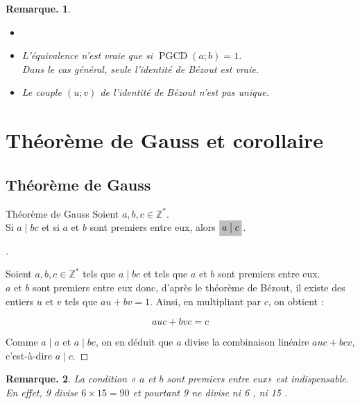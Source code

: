 \documentclass[12pt]{article}
\newcommand{\hideM}[1]{\mbox{\vphantom{$#1$}\smash{\colorbox{gray!50}{$\displaystyle #1$}}} }
\theoremstyle{break}
\newtheorem*{remark}{Remarque.}
\newenvironment{demo}[1][\proofname]{%
  \begin{proof}[#1]$ $\newline
}{%
  \end{proof}
}
\begin{document}
\begin{remark}
\begin{itemize}[noitemsep,topsep=0pt]
  \item[]
  \item L'équivalence n'est vraie que si $\operatorname{PGCD}(a ; b)=1$.
  \\Dans le cas général, seule l'identité de Bézout est vraie.
  \item Le couple $(u ; v)$ de l'identité de Bézout n'est pas unique.
\end{itemize}
\end{remark}

\section{Théorème de Gauss et corollaire}
\subsection{Théorème de Gauss}
\begin{proposition}{Théorème de Gauss}{}
Soient $a, b, c \in \mathbb{Z}^{*}$.\\
Si $a \mid b c$ et si $a$ et $b$ sont premiers entre eux, alors $\hideM{a \mid c}$.
\end{proposition}

\begin{demo}
Soient $a, b, c \in \mathbb{Z}^{*}$ tels que $a \mid b c$ et tels que $a$ et $b$ sont premiers entre eux.\\
$a$ et $b$ sont premiers entre eux donc, d'après le théorème de Bézout, il existe des entiers $u$ et $v$ tels que $a u+b v=1$. Ainsi, en multipliant par $c$, on obtient :

$$
a u c+b v c=c
$$

Comme $a \mid a$ et $a \mid b c$, on en déduit que $a$ divise la combinaison linéaire $a u c+b c v$, c'est-à-dire $a \mid c$.
\end{demo}

\begin{remark}
La condition « $a$ et $b$ sont premiers entre eux» est indispensable.\\
En effet, 9 divise $6 \times 15=90$ et pourtant 9 ne divise ni 6 , ni 15 .
\end{remark}
\end{document}
